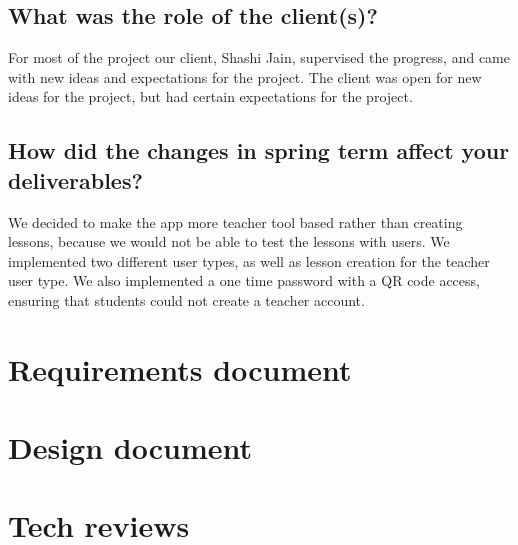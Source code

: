 \documentclass[draftclsnofoot,10pt,onecolumn]{IEEEtran}
\begin{document}
\subsection{What was the role of the client(s)?} %
For most of the project our client, Shashi Jain, supervised the progress, and came with new ideas and expectations for the project. The client was open for new ideas for the project, but had certain expectations for the project.
\subsection{How did the changes in spring term affect your deliverables?}
We decided to make the app more teacher tool based rather than creating lessons, because we would not be able to test the lessons with users. We implemented two different user types, as well as lesson creation for the teacher user type. We also implemented a one time password with a QR code access, ensuring that students could not create a teacher account.


\clearpage
\section{Requirements document}


\clearpage
\section{Design document}


\clearpage
\section{Tech reviews}




\end{document}
